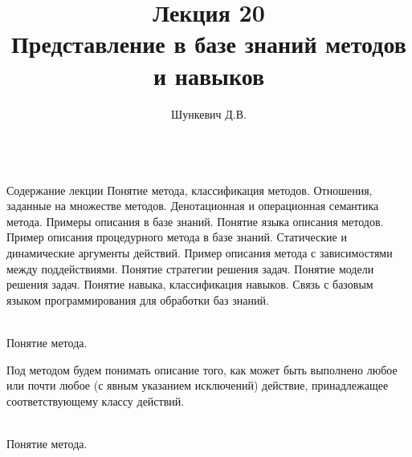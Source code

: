 \title{Лекция 20\\Представление в базе знаний методов и навыков}
\author[]{Шункевич Д.В.}

\begin{frame}
	\titlepage
\end{frame}


\begin{frame}{\\Содержание лекции}
	\topline
	\justifying
	Понятие метода, классификация методов. Отношения, заданные на множестве методов. Денотационная и операционная семантика метода. Примеры описания в базе знаний. Понятие языка описания методов. Пример описания процедурного метода в базе знаний. Статические и динамические аргументы действий. Пример описания метода с зависимостями между поддействиями. Понятие стратегии решения задач. Понятие модели решения задач. Понятие навыка, классификация навыков. Связь с базовым языком программирования для обработки баз знаний.
\end{frame}

\begin{frame}{\\Понятие метода.}
	\topline
	\justifying
    \begin{SCn}
    Под методом будем понимать описание того, как может быть выполнено любое или почти любое (с явным указанием исключений) действие, принадлежащее соответствующему классу действий.
    \end{SCn}
\end{frame}

\begin{frame}{\\Понятие метода.}
	\topline
	\justifying
    \begin{SCn}
    \end{SCn}
\end{frame}

